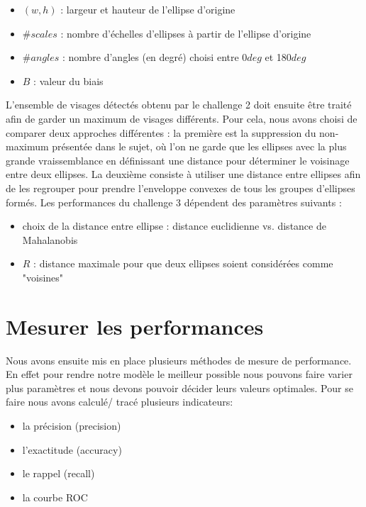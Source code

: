 \documentclass[a4paper,12pt, openany]{book}
\theoremstyle{break}
\begin{document}
\begin{itemize}
  \item $(w, h)$ : largeur et hauteur de l'ellipse d'origine
  \item $\# scales$ : nombre d'échelles d'ellipses à partir de l'ellipse d'origine
  \item $\# angles$ : nombre d'angles (en degré) choisi entre 0$deg$ et 180$deg$
  \item $B$ : valeur du biais
\end{itemize}


L'ensemble de visages détectés obtenu par le challenge 2 doit ensuite être traité afin de garder un maximum de visages différents. Pour cela, nous avons choisi de comparer deux approches différentes : la première est la suppression du non-maximum présentée dans le sujet, où l'on ne garde que les ellipses avec la plus grande vraissemblance en définissant une distance pour déterminer le voisinage entre deux ellipses. La deuxième consiste à utiliser une distance entre ellipses afin de les regrouper pour prendre l'enveloppe convexes de tous les groupes d'ellipses formés. Les performances du challenge 3 dépendent des paramètres suivants :

\begin{itemize}
  \item choix de la distance entre ellipse : distance euclidienne vs. distance de Mahalanobis
  \item $R$ : distance maximale pour que deux ellipses soient considérées comme "voisines"
\end{itemize}

\section{Mesurer les performances}
Nous avons ensuite mis en place plusieurs méthodes de mesure de performance. En effet pour rendre notre modèle le meilleur possible nous pouvons faire varier plus paramètres et nous devons pouvoir décider leurs valeurs optimales.
Pour se faire nous avons calculé/ tracé plusieurs indicateurs:

\begin{itemize}
  \item la précision (precision)
  \item l'exactitude (accuracy)
  \item le rappel (recall)
  \item la courbe ROC
\end{itemize}
\end{document}
